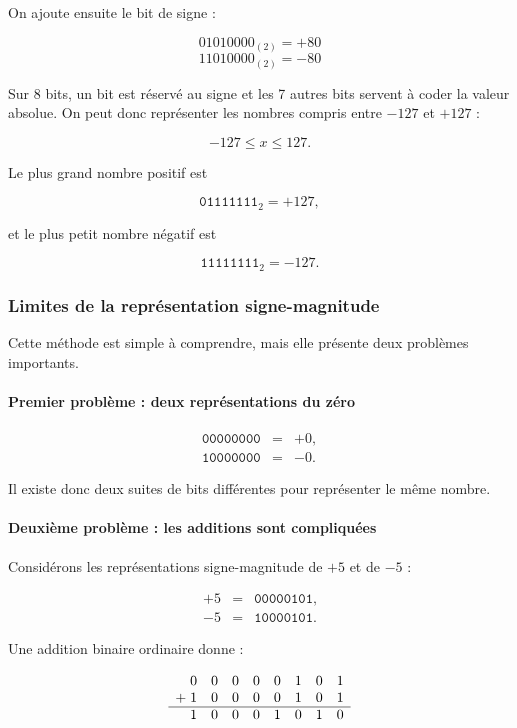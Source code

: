 \documentclass[11pt, a4paper]{book}
\begin{document}
On ajoute ensuite le bit de signe :

\[
01010000_{(2)} = +80
\]
\[
11010000_{(2)} = -80
\]

Sur 8 bits, un bit est réservé au signe et les 7 autres bits servent à coder
la valeur absolue. On peut donc représenter les nombres compris entre
$-127$ et $+127$ :

\[
    -127 \leqslant x \leqslant 127.
\]

Le plus grand nombre positif est

\[
    \texttt{01111111}_2=+127,
\]

et le plus petit nombre négatif est

\[
    \texttt{11111111}_2=-127.
\]

\subsubsection{Limites de la représentation signe-magnitude}

Cette méthode est simple à comprendre, mais elle présente deux problèmes
importants.

\paragraph{Premier problème : deux représentations du zéro}

\[
\begin{array}{rcl}
\texttt{00000000} &=& +0,\\
\texttt{10000000} &=& -0.
\end{array}
\]

Il existe donc deux suites de bits différentes pour représenter le même
nombre.

\paragraph{Deuxième problème : les additions sont compliquées}

Considérons les représentations signe-magnitude de $+5$ et de $-5$ :

\[
\begin{array}{rcl}
+5 &=& \texttt{00000101},\\
-5 &=& \texttt{10000101}.
\end{array}
\]

Une addition binaire ordinaire donne :

\[
\begin{array}{r@{\;}*{8}{c}}
  & 0&0&0&0&0&1&0&1\\
+ & 1&0&0&0&0&1&0&1\\
\hline
  & 1&0&0&0&1&0&1&0
\end{array}
\]
\end{document}
